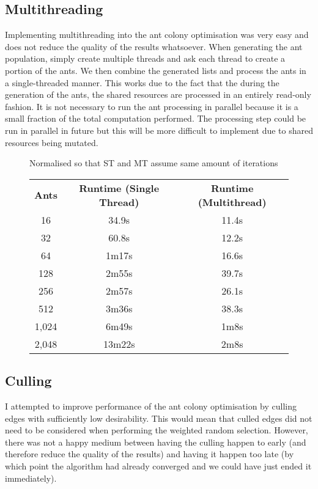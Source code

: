 \documentclass[a4paper, 11pt,table]{article}
\begin{document}
	\subsection{Multithreading}
	Implementing multithreading into the ant colony optimisation was very easy and does not reduce the quality of the results whatsoever. When generating the ant population, simply create multiple threads and ask each thread to create a portion of the ants. We then combine the generated lists and process the ants in a single-threaded manner. This works due to the fact that the during the generation of the ants, the shared resources are processed in an entirely read-only fashion. It is not necessary to run the ant processing in parallel because it is a small fraction of the total computation performed. The processing step could be run in parallel in future but this will be more difficult to implement due to shared resources being mutated.
	
\begin{figure}
	\begin{center}
		Normalised so that ST and MT assume same amount of iterations
		
		\begin{tabu}{|c c c|}
			\textbf{Ants} & \textbf{Runtime (Single Thread)} & \textbf{Runtime (Multithread)} \\
			16 & 34.9s & 11.4s \\
			32 & 60.8s & 12.2s \\
			64 & 1m17s & 16.6s \\
			128 & 2m55s & 39.7s \\
			256 & 2m57s & 26.1s \\
			512 & 3m36s & 38.3s \\
			1,024 & 6m49s & 1m8s \\
			2,048 & 13m22s & 2m8s \\
		\end{tabu}
	\end{center}
\end{figure}
	
	\subsection{Culling}
	I attempted to improve performance of the ant colony optimisation by culling edges with sufficiently low desirability. This would mean that culled edges did not need to be considered when performing the weighted random selection. However, there was not a happy medium between having the culling happen to early (and therefore reduce the quality of the results) and having it happen too late (by which point the algorithm had already converged and we could have just ended it immediately).
	
\end{document}
